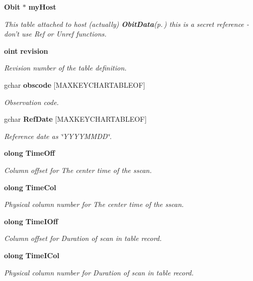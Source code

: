 \begin{CompactItemize}
{\bf Obit} $\ast$ {\bf my\-Host}
\begin{CompactList}\small\item\em This table attached to host (actually) {\bf Obit\-Data}{\rm (p.\,\pageref{structObitData})} this is a secret reference - don't use Ref or Unref functions. \item\end{CompactList}\item 
{\bf oint} {\bf revision}
\begin{CompactList}\small\item\em Revision number of the table definition. \item\end{CompactList}\item 
gchar {\bf obscode} [MAXKEYCHARTABLEOF]
\begin{CompactList}\small\item\em Observation code. \item\end{CompactList}\item 
gchar {\bf Ref\-Date} [MAXKEYCHARTABLEOF]
\begin{CompactList}\small\item\em Reference date as \char`\"{}YYYYMMDD\char`\"{}. \item\end{CompactList}\item 
{\bf olong} {\bf Time\-Off}
\begin{CompactList}\small\item\em Column offset for The center time of the sscan. \item\end{CompactList}\item 
{\bf olong} {\bf Time\-Col}
\begin{CompactList}\small\item\em Physical column number for The center time of the sscan. \item\end{CompactList}\item 
{\bf olong} {\bf Time\-IOff}
\begin{CompactList}\small\item\em Column offset for Duration of scan in table record. \item\end{CompactList}\item 
{\bf olong} {\bf Time\-ICol}
\begin{CompactList}\small\item\em Physical column number for Duration of scan in table record. \item\end{CompactList}\item 

\end{CompactItemize}
